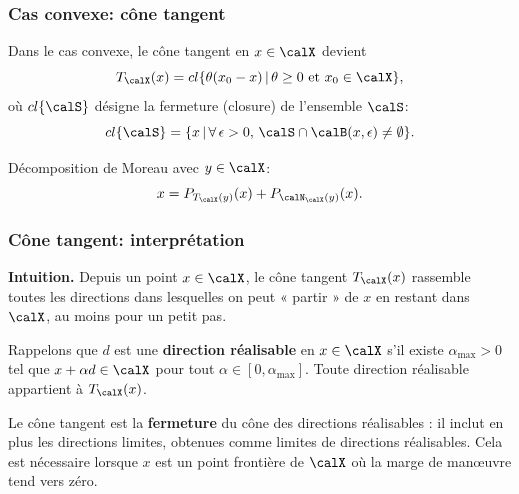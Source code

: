\documentclass[t,aspectratio=169,usepdftitle=false]{beamer}
\def\cB{\calB}
\def\cN{\calN}
\def\cS{\calS}
\def\cX{\calX}
\begin{document}
\begin{frame}
\frametitle{Cas convexe: cône tangent}

Dans le cas convexe, le cône tangent en $x \in \cX$ devient
$$
T_{\cX}(x) = cl\{ \theta(x_0-x) \,|\, \theta \geq 0 \mbox{ et } x_0 \in \cX \},
$$
où $cl\{\cS\}$ désigne la fermeture (closure) de l'ensemble $\cS$:
$$
cl\{\cS\} = \{ x \,|\, \forall\, \epsilon > 0,\, \cS \cap \cB(x,\epsilon) \ne \emptyset \}.
$$

\mbox{}

Décomposition de Moreau avec $y \in \cX$:
$$
x = P_{T_{\cX}(y)}(x) + P_{\cN_{\cX}(y)}(x).
$$

\end{frame}

\begin{frame}
\frametitle{Cône tangent: interprétation}

\textbf{Intuition.} Depuis un point $x \in \cX$, le cône tangent $T_{\cX}(x)$ rassemble toutes les directions dans lesquelles on peut « partir » de $x$ en restant dans $\cX$, au moins pour un petit pas.

\mbox{}

Rappelons que $d$ est une \textbf{direction réalisable} en $x \in \cX$ s'il existe $\alpha_{\max} > 0$ tel que $x + \alpha d \in \cX$ pour tout $\alpha \in [0, \alpha_{\max}]$. Toute direction réalisable appartient à $T_{\cX}(x)$.

\mbox{}

Le cône tangent est la \textbf{fermeture} du cône des directions réalisables : il inclut en plus les directions limites, obtenues comme limites de directions réalisables. Cela est nécessaire lorsque $x$ est un point frontière de $\cX$ où la marge de manœuvre tend vers zéro.

\end{frame}
\end{document}
